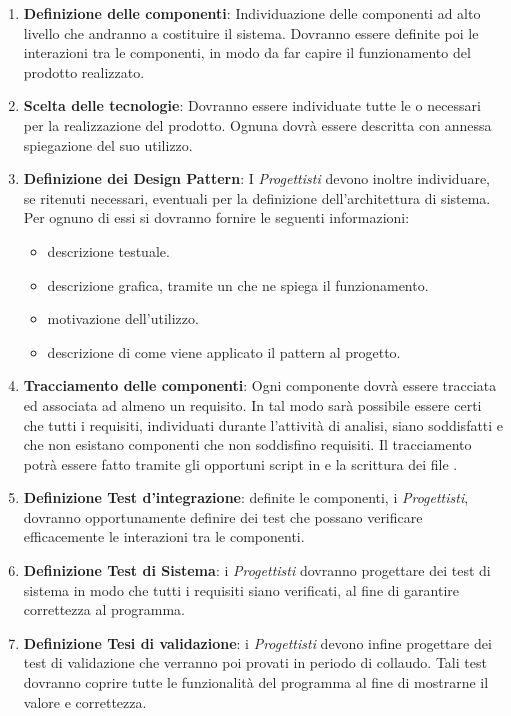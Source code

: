 \begin{enumerate}
\item \textbf{Definizione delle componenti}: Individuazione delle componenti ad alto livello che andranno a costituire il sistema. Dovranno essere definite poi le interazioni tra le componenti, in modo da far capire il funzionamento del prodotto realizzato.
\item \textbf{Scelta delle tecnologie}: Dovranno essere individuate tutte le  o  necessari per la realizzazione del prodotto. Ognuna dovrà essere descritta con annessa spiegazione del suo utilizzo.
\item \textbf{Definizione dei Design Pattern}: I \textit{Progettisti} devono inoltre individuare, se ritenuti necessari, eventuali  per la definizione dell'architettura di sistema. Per ognuno di essi si dovranno fornire le seguenti informazioni:
\begin{itemize}
\item descrizione testuale.
\item descrizione grafica, tramite un  che ne spiega il funzionamento.
\item motivazione dell'utilizzo.
\item descrizione di come viene applicato il pattern al progetto.
\end{itemize}
\item  \textbf{Tracciamento delle componenti}: Ogni componente dovrà essere tracciata ed associata ad almeno un requisito. In tal modo sarà possibile essere certi che tutti i requisiti, individuati durante l'attività di analisi, siano soddisfatti e che non esistano componenti che non soddisfino requisiti. Il tracciamento potrà essere fatto tramite gli opportuni script in  e la scrittura dei file .
\item \textbf{Definizione Test d'integrazione}: definite le componenti, i \textit{Progettisti}, dovranno opportunamente definire dei test che possano verificare efficacemente le interazioni tra le componenti.
\item \textbf{Definizione Test di Sistema}: i \textit{Progettisti} dovranno progettare dei test di sistema in modo che tutti i requisiti siano verificati, al fine di garantire correttezza al programma.
\item \textbf{Definizione Tesi di validazione}: i \textit{Progettisti} devono infine progettare dei test di validazione che verranno poi provati in periodo di collaudo. Tali test dovranno coprire tutte le funzionalità del programma al fine di mostrarne il valore e correttezza.
\end{enumerate}


